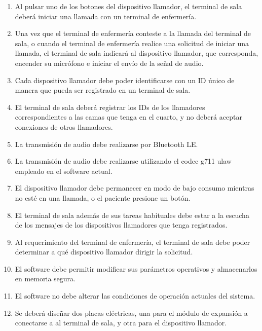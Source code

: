 \begin{enumerate}

\item Al pulsar uno de los botones del dispositivo llamador, el terminal de sala deberá iniciar una llamada con un terminal de enfermería.

\item Una vez que el terminal de enfermería conteste a la llamada del terminal de sala, o cuando el terminal de enfermería realice una solicitud de iniciar una llamada, el terminal de sala indicará al dispositivo llamador, que corresponda, encender su micrófono e iniciar el envío de la señal de audio.

\item Cada dispositivo llamador debe poder identificarse con un ID único de manera que pueda ser registrado en un terminal de sala.

\item El terminal de sala deberá registrar los IDs de los llamadores correspondientes a las camas que tenga en el cuarto, y no deberá aceptar conexiones de otros llamadores.

\item La transmisión de audio debe realizarse por Bluetooth LE.

\item La transmisión de audio debe realizarse utilizando el codec g711 ulaw empleado en el software actual.

\item El dispositivo llamador debe permanecer en modo de bajo consumo mientras no esté en una llamada, o el paciente presione un botón.

\item El terminal de sala además de sus tareas habituales debe estar a la escucha de los mensajes de los dispositivos llamadores que tenga registrados.

\item Al requerimiento del terminal de enfermería, el terminal de sala debe poder determinar a qué dispositivo llamador dirigir la solicitud.

\item El software debe permitir modificar sus parámetros operativos y almacenarlos en memoria segura.

\item El software no debe alterar las condiciones de operación actuales  del sistema.

\item Se deberá diseñar dos placas eléctricas, una para el módulo de expansión a conectarse a al terminal de sala, y otra para el dispositivo llamador.

\end{enumerate}

